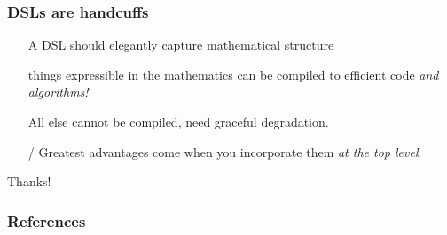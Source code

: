 \documentclass[presentation]{beamer}
\newcommand{\cmark}{\ding{51}}
\newcommand{\xmark}{\ding{55}}
\begin{document}
\begin{frame}
  \frametitle{DSLs are handcuffs}

  \begin{itemize}
  \item[\cmark] A DSL should elegantly capture mathematical structure
  \item[\cmark] things expressible in the mathematics can be compiled
    to efficient code \emph{and algorithms!}
  \item[\xmark] All else cannot be compiled, need graceful
    degradation.
  \item[\xmark/\cmark] Greatest advantages come when you incorporate
    them \emph{at the top level}.
  \end{itemize}
\end{frame}

\begin{frame}[standout]
  Thanks!
\end{frame}
\appendix
\begin{frame}
  \frametitle{References}
  \printbibliography[heading=none]
\end{frame}
\end{document}
